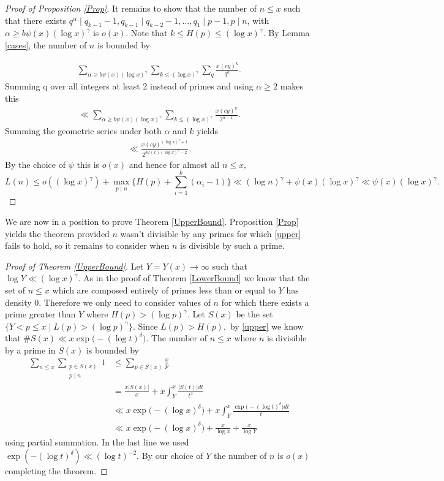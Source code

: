 \documentclass[12pt,regno]{amsart}
\begin{document}
\begin{proof}[Proof of Proposition \ref{Prop}]
It remains to show that the number of $n \le x$ such that there exists $q^{\alpha} \mid q_{k-1}-1,q_{k-1} \mid q_{k-2}-1,\dots,q_1 \mid p-1,p \mid n$, with $\alpha \ge b\psi(x)(\log x)^\gamma$ is $o(x).$ Note that $k \le H(p) \le (\log x)^\gamma.$ By Lemma \ref{cases}, the number of $n$ is bounded by

\begin{align*}
\sum_{\alpha \ge b\psi(x)(\log x)^\gamma}\sum_{k \le (\log x)^\gamma}\sum_q\frac{x(cy)^k}{q^\alpha}.
\end{align*} Summing q over all integers at least 2 instead of primes and using $\alpha \ge 2$ makes this
\begin{align*}
\ll \sum_{\alpha \ge b\psi(x)(\log x)^\gamma}\sum_{k \le (\log x)^\gamma}\frac{x(cy)^k}{2^{\alpha-1}}.
\end{align*} Summing the geometric series under both $\alpha$ and $k$ yields
\begin{align*}
\ll \frac{x(cy)^{(\log x)^\gamma+1}}{2^{b\psi(x)(\log x)^\gamma-2}}.
\end{align*} By the choice of $\psi$ this is $o(x)$ and hence for almost all $n \le x,$
$$L(n) \le o((\log x)^\gamma) + \max_{p \mid n} \bigg\{H(p) + \sum_{i=1}^{k}(\alpha_i-1)\bigg\} \ll (\log n)^\gamma + \psi(x)(\log x)^\gamma \ll \psi(x)(\log x)^\gamma.$$
\end{proof}

We are now in a position to prove Theorem \ref{UpperBound}. Proposition \ref{Prop} yields the theorem provided $n$ wasn't divisible by any primes for which \eqref{upper} fails to hold, so it remains to consider when $n$ is divisible by such a prime.

\begin{proof}[Proof of Theorem \ref{UpperBound}]
Let $Y=Y(x)\rightarrow \infty$ such that $\log Y \ll (\log x)^{\gamma}.$ As in the proof of Theorem \ref{LowerBound} we know that the set of $n \le x$ which are composed entirely of primes less than or equal to $Y$ has density 0. Therefore we only need to consider values of $n$ for which there exists a prime greater than $Y$ where $H(p)>(\log p)^{\gamma}.$ Let $S(x)$ be the set $\{Y < p \le x \mid L(p)>(\log p)^{\gamma} \}.$ Since $L(p)>H(p),$ by \eqref{upper} we know that $\#S(x) \ll x\exp\big({-}(\log t)^\delta\big).$ The number of $n \le x$ where $n$ is divisible by a prime in $S(x)$ is bounded by
\begin{align*}
\sum_{n \le x}\sum_{\substack{p \in S(x) \\ p \mid n}} 1 &\le \sum_{p \in S(x)}\frac{x}{p} \\
& = \frac{x{\lvert{S(x)}\rvert}}{x}+x\int_Y^x\frac{{\lvert{S(t)}\rvert}dt}{t^2} \\
& \ll x\exp\big({-}(\log x)^\delta \big)+x\int_Y^x\frac{\exp\big({-}(\log t)^\delta\big) dt}{t} \\
& \ll x\exp\big({-}(\log x)^\delta \big)+\frac{x}{\log x}+\frac{x}{\log Y}
\end{align*}using partial summation. In the last line we used $\exp({-}(\log t)^{\delta}) \ll (\log t)^{-2}.$ By our choice of $Y$ the number of $n$ is $o(x)$ completing the theorem.
\end{proof}
\end{document}
